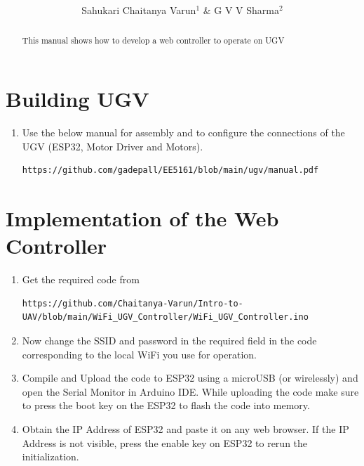 \documentclass[journal,12pt,twocolumn]{IEEEtran}
\renewcommand\thesection{\arabic{section}}
\begin{document}
     \def\rightbox#1{\makebox[0in][r]{#1}}
     \def\centbox#1{\makebox[0in]{#1}}
     \def\topbox#1{\raisebox{-\baselineskip}[0in][0in]{#1}}
     \def\midbox#1{\raisebox{-0.5\baselineskip}[0in][0in]{#1}}
\vspace{3cm}
\title{ 
}
\author{Sahukari Chaitanya Varun$^{1}$ \& G V V Sharma$^{2}$ 
}
\maketitle
\tableofcontents
\renewcommand{\thefigure}{\theenumi}
\renewcommand{\thetable}{\theenumi}
\bigskip
\begin{abstract}
%
This manual shows how to develop a web controller to operate on UGV
%
\end{abstract}
\section{Building UGV}
%
\begin{enumerate}[label=\thesection.\arabic*
,ref=\thesection.\theenumi]
\item Use the below manual for assembly and to configure the connections of the UGV (ESP32, Motor Driver and Motors).
\begin{lstlisting}
https://github.com/gadepall/EE5161/blob/main/ugv/manual.pdf
\end{lstlisting}
\end{enumerate}
\section{Implementation of the Web Controller}
\begin{enumerate}[label=\thesection.\arabic*
,ref=\thesection.\theenumi]
\item Get the required code from 
\begin{lstlisting}
https://github.com/Chaitanya-Varun/Intro-to-UAV/blob/main/WiFi_UGV_Controller/WiFi_UGV_Controller.ino
\end{lstlisting}
%
\item Now change the SSID and password in the required field in the code corresponding to the local WiFi you use for operation.
\item Compile and Upload the code to ESP32 using a microUSB (or wirelessly) and open the Serial Monitor in Arduino IDE. While uploading the code make sure to press the boot key on the ESP32 to flash the code into memory.
\item Obtain the IP Address of ESP32 and paste it on any web browser. If the IP Address is not visible, press the enable key on ESP32 to rerun the initialization.
\end{enumerate}
\end{document}
